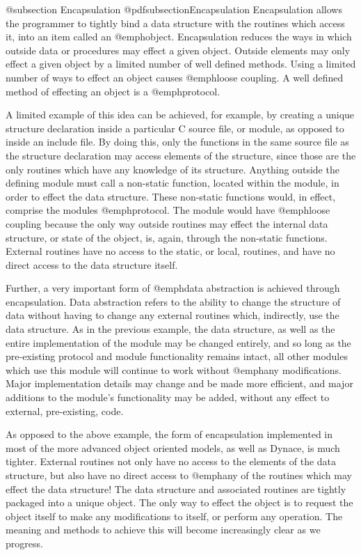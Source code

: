 @subsection Encapsulation
@pdfsubsection{Encapsulation}
Encapsulation allows the programmer to tightly bind a data structure
with the routines which access it, into an item called an @emph{object}.
Encapsulation reduces the ways in which outside data or procedures may
effect a given object.  Outside elements may only effect a given object
by a limited number of well defined methods.  Using a limited number of
ways to effect an object causes @emph{loose coupling}.  A well defined
method of effecting an object is a @emph{protocol}.

A limited example of this idea can be achieved, for example, by creating
a unique structure declaration inside a particular C source file, or
module, as opposed to inside an include file.  By doing this, only the
functions in the same source file as the structure declaration may
access elements of the structure, since those are the only routines
which have any knowledge of its structure.  Anything outside the
defining module must call a non-static function, located within the
module, in order to effect the data structure.  These non-static
functions would, in effect, comprise the modules @emph{protocol}.  The
module would have @emph{loose coupling} because the only way outside
routines may effect the internal data structure, or state of the object,
is, again, through the non-static functions.  External routines have no
access to the static, or local, routines, and have no direct access to
the data structure itself.

Further, a very important form of @emph{data abstraction} is achieved
through encapsulation. Data abstraction refers to the ability to change
the structure of data without having to change any external routines
which, indirectly, use the data structure.  As in the previous example,
the data structure, as well as the entire implementation of the module
may be changed entirely, and so long as the pre-existing protocol and
module functionality remains intact, all other modules which use this
module will continue to work without @emph{any} modifications.  Major
implementation details may change and be made more efficient, and
major additions to the module's functionality may be added, without
any effect to external, pre-existing, code.

As opposed to the above example, the form of encapsulation implemented
in most of the more advanced object oriented models, as well as Dynace, is
much tighter.  External routines not only have no access to the elements
of the data structure, but also have no direct access to @emph{any} of
the routines which may effect the data structure!  The data structure
and associated routines are tightly packaged into a unique object.  The
only way to effect the object is to request the object itself to make
any modifications to itself, or perform any operation.  The meaning and
methods to achieve this will become increasingly clear as we progress.


